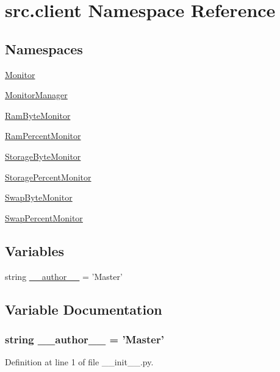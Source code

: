 \hypertarget{namespacesrc_1_1client}{\section{src.\-client Namespace Reference}
\label{namespacesrc_1_1client}
}
\subsection*{Namespaces}
\begin{DoxyCompactItemize}
\item 
\hyperlink{namespacesrc_1_1client_1_1_monitor}{Monitor}
\item 
\hyperlink{namespacesrc_1_1client_1_1_monitor_manager}{Monitor\-Manager}
\item 
\hyperlink{namespacesrc_1_1client_1_1_ram_byte_monitor}{Ram\-Byte\-Monitor}
\item 
\hyperlink{namespacesrc_1_1client_1_1_ram_percent_monitor}{Ram\-Percent\-Monitor}
\item 
\hyperlink{namespacesrc_1_1client_1_1_storage_byte_monitor}{Storage\-Byte\-Monitor}
\item 
\hyperlink{namespacesrc_1_1client_1_1_storage_percent_monitor}{Storage\-Percent\-Monitor}
\item 
\hyperlink{namespacesrc_1_1client_1_1_swap_byte_monitor}{Swap\-Byte\-Monitor}
\item 
\hyperlink{namespacesrc_1_1client_1_1_swap_percent_monitor}{Swap\-Percent\-Monitor}
\end{DoxyCompactItemize}
\subsection*{Variables}
\begin{DoxyCompactItemize}
\item 
string \hyperlink{namespacesrc_1_1client_a629d61dfe4da763164a4d1a2d85b0afd}{\-\_\-\-\_\-author\-\_\-\-\_\-} = 'Master'
\end{DoxyCompactItemize}


\subsection{Variable Documentation}
\hypertarget{namespacesrc_1_1client_a629d61dfe4da763164a4d1a2d85b0afd}{
\subsubsection[{\-\_\-\-\_\-author\-\_\-\-\_\-}]{\setlength{\rightskip}{0pt plus 5cm}string \-\_\-\-\_\-author\-\_\-\-\_\- = 'Master'}}\label{namespacesrc_1_1client_a629d61dfe4da763164a4d1a2d85b0afd}


Definition at line 1 of file \-\_\-\-\_\-init\-\_\-\-\_\-.\-py.

